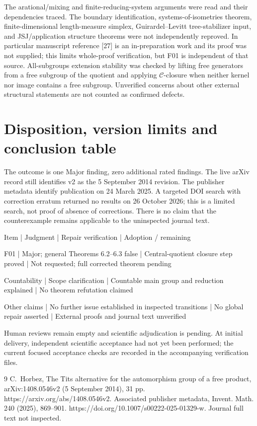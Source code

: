 \documentclass[10pt]{article}
\begin{document}
The arational/mixing and finite-reducing-system arguments were read and their dependencies traced. The boundary identification, systems-of-isometries theorem, finite-dimensional length-measure simplex, Guirardel–Levitt tree-stabilizer input, and JSJ/application structure theorems were not independently reproved. In particular manuscript reference [27] is an in-preparation work and its proof was not supplied; this limits whole-proof verification, but F01 is independent of that source. All-subgroups extension stability was checked by lifting free generators from a free subgroup of the quotient and applying \(\mathcal C\)-closure when neither kernel nor image contains a free subgroup. Unverified concerns about other external structural statements are not counted as confirmed defects.\par
\section*{Disposition, version limits and conclusion table}
The outcome is one Major finding, zero additional rated findings. The live arXiv record still identifies v2 as the 5 September 2014 revision. The publisher metadata identify publication on 24 March 2025. A targeted DOI search with correction erratum returned no results on 26 October 2026; this is a limited search, not proof of absence of corrections. There is no claim that the counterexample remains applicable to the uninspected journal text.\par
Item | Judgment | Repair verification | Adoption / remaining\par
F01 | Major; general Theorems 6.2–6.3 false | Central-quotient closure step proved | Not requested; full corrected theorem pending\par
Countability | Scope clarification | Countable main group and reduction explained | No theorem refutation claimed\par
Other claims | No further issue established in inspected transitions | No global repair asserted | External proofs and journal text unverified\par
Human reviews remain empty and scientific adjudication is pending. At initial delivery, independent scientific acceptance had not yet been performed; the current focused acceptance checks are recorded in the accompanying verification files.\par
9 C. Horbez, The Tits alternative for the automorphism group of a free product, arXiv:1408.0546v2 (5 September 2014), 31 pp. https://arxiv.org/abs/1408.0546v2. Associated publisher metadata, Invent. Math. 240 (2025), 869–901. https://doi.org/10.1007/s00222-025-01329-w. Journal full text not inspected.\par
\end{document}
